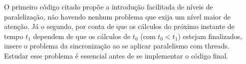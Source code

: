 O primeiro código citado propõe a introdução facilitada de níveis de paralelização, não havendo nenhum problema que exija 
um nível maior de atenção. Já o segundo, por conta de que os cálculos do próximo instante de tempo $t_1$ dependem de que os cálculos de $t_0$
(com $t_0 < t_1$) estejam finalizados, insere o problema da sincronização ao se aplicar paralelismo com \gls{threads}. Estudar esse problema
é essencial antes de se implementar o código final.

